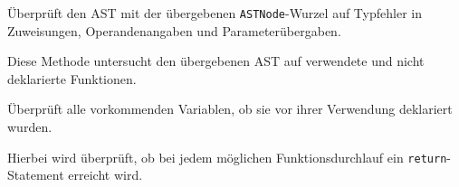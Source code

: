 \begin{description}
		Überprüft den AST mit der übergebenen \texttt{ASTNode}-Wurzel auf Typfehler in Zuweisungen, Operandenangaben und Parameterübergaben.

		Diese Methode untersucht den übergebenen AST auf verwendete und nicht deklarierte Funktionen.

		Überprüft alle vorkommenden Variablen, ob sie vor ihrer Verwendung deklariert wurden.

		Hierbei wird überprüft, ob bei jedem möglichen Funktionsdurchlauf ein \texttt{return}-Statement erreicht wird.

\end{description}

